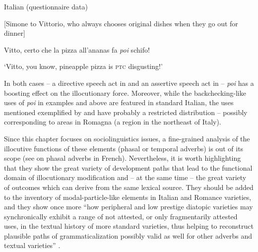 \ea%
    \label{ex:key:105}

           Italian (questionnaire data)

[Simone to Vittorio, who always chooses original dishes when they go out for dinner]

Vitto, certo che la pizza all’ananas fa \textit{poi} schifo!

\glt ‘Vitto, you know, pineapple pizza is \textsc{ptc} disgusting!’
    \z %

In both cases – a directive speech act in  and an assertive speech act in  – \textit{poi} has a boosting effect on the illocutionary force. Moreover, while the backchecking-like uses of \textit{poi} in examples  and  above are featured in standard Italian, the uses mentioned exemplified by  and  have probably a restricted distribution – possibly corresponding to areas in Romagna (a region in the northeast of Italy).

Since this chapter focuses on sociolinguistics issues, a fine-grained analysis of the illocutive functions of these elements (phasal or temporal adverbs) is out of its scope (see \citealt{Hansen2008} on phasal adverbs in French). Nevertheless, it is worth highlighting that they show the great variety of development paths that lead to the functional domain of illocutionary modification and – at the same time – the great variety of outcomes which can derive from the same lexical source. They should be added to the inventory of modal-particle-like elements in Italian and Romance varieties, and they show once more “how peripheral and low prestige diatopic varieties may synchronically exhibit a range of not attested, or only fragmentarily attested uses, in the textual history of more standard varieties, thus helping to reconstruct plausible paths of grammaticalization possibly valid as well for other adverbs and textual varieties” \citep[113]{Calaresu2015}.

